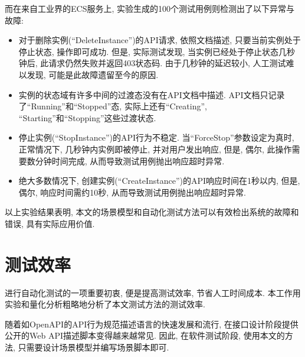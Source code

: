         而在来自工业界的ECS服务上, 实验生成的100个测试用例则检测出了以下异常与故障:
        \begin{itemize}
            \item 对于删除实例(“DeleteInstance”)的API请求, 依照文档描述, 只要当前实例处于停止状态, 操作即可成功. 但是, 实际测试发现, 当实例已经处于停止状态几秒钟后, 此请求仍然失败并返回403状态码. 由于几秒钟的延迟较小, 人工测试难以发现, 可能是此故障遗留至今的原因.
            
            \item 实例的状态域有许多中间的过渡态没有在API文档中描述. API文档只记录了“Running”和“Stopped”态, 实际上还有“Creating”, “Starting”和“Stopping”这些过渡状态.
            
            \item 停止实例(“StopInstance”)的API行为不稳定. 当“ForceStop”参数设定为真时, 正常情况下, 几秒钟内实例即被停止, 并对用户发出响应, 但是, 偶尔, 此操作需要数分钟时间完成, 从而导致测试用例抛出响应超时异常.
            
            \item 绝大多数情况下, 创建实例(“CreateInstance”)的API响应时间在1秒以内, 但是, 偶尔, 响应时间需约10秒, 从而导致测试用例抛出响应超时异常.
        \end{itemize}
        
        以上实验结果表明, 本文的场景模型和自动化测试方法可以有效检出系统的故障和错误, 具有实际应用价值.
    
    \section{测试效率}

        进行自动化测试的一项重要初衷, 便是提高测试效率, 节省人工时间成本. 本工作用实验和量化分析粗略地分析了本文测试方法的测试效率.
        
        随着如OpenAPI的API行为规范描述语言的快速发展和流行, 在接口设计阶段提供公开的Web API描述脚本变得越来越常见. 因此, 在软件测试阶段, 使用本文的方法, 只需要设计场景模型并编写场景脚本即可.
        
